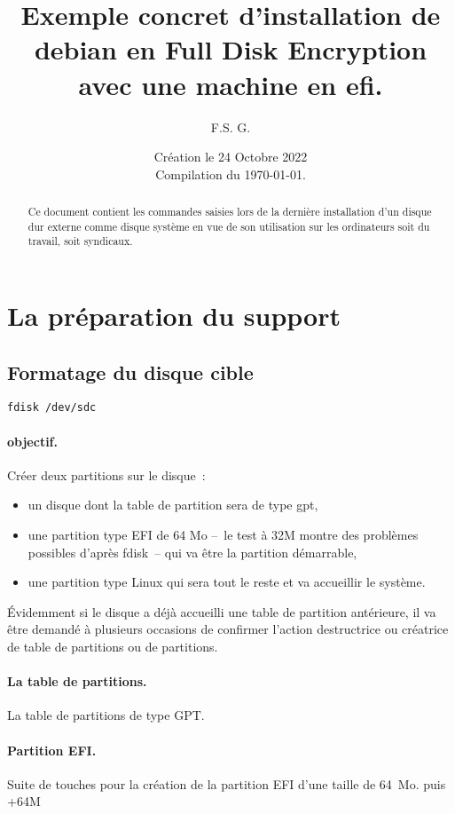 \documentclass[12pt, a4paper]{article}
\title{Exemple concret d'installation de debian en Full Disk Encryption avec une machine en efi.}
\author{F.S. G.}
\date{Création le 24 Octobre 2022\\%
Compilation du \today{}.}
\begin{document}
\maketitle

\begin{abstract}
	Ce document contient les commandes saisies lors de la dernière installation d'un disque dur externe comme disque système en vue de son utilisation sur les ordinateurs soit du travail, soit syndicaux.
\end{abstract}

\section{La préparation du support}

\subsection{Formatage du disque cible}
\begin{verbatim}
fdisk /dev/sdc
\end{verbatim}

\paragraph{objectif.} Créer deux partitions sur le disque~:
\begin{itemize}
	\item un disque dont la table de partition sera de type gpt,
	\item une partition type EFI de 64 Mo --~le test à 32M montre des problèmes possibles d'après fdisk~-- qui va être la partition démarrable,
	\item une partition type Linux qui sera tout le reste et va accueillir le système.
\end{itemize}
Évidemment si le disque a déjà accueilli une table de partition antérieure, il va être demandé à plusieurs occasions de confirmer l'action destructrice ou créatrice de table de partitions ou de partitions.

\paragraph{La table de partitions.} La table de partitions de type GPT. \newline
{} 

\paragraph{Partition EFI.} Suite de touches pour la création de la partition EFI d'une taille de 64~Mo.
 puis   +64M   
\end{document}

